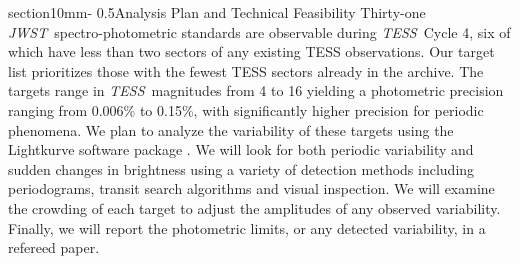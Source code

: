 \documentclass[letterpaper,12pt]{article}
\makeatletter
\renewcommand{\section}{\@startsection%
{section}{1}{0mm}{-\baselineskip}%
{0.5\baselineskip}{\normalfont\Large\bfseries}}%
\newcommand{\tess}{{\it TESS}}
\newcommand{\jwst}{{\it JWST}}
\makeatother
\begin{document}
\section{Analysis Plan and Technical Feasibility}
Thirty-one \jwst\ spectro-photometric standards are observable during \tess\ Cycle 4, six of which have less than two sectors of any existing TESS observations. Our target list prioritizes those with the fewest TESS sectors already in the archive. The targets range in \tess\ magnitudes from 4 to 16 yielding a photometric precision ranging from 0.006\% to 0.15\%, with significantly higher precision for periodic phenomena.  We plan to analyze the variability of these targets using the Lightkurve software package \citep{2018ascl.soft12013L}. We will look for both periodic variability and sudden changes in brightness using a variety of detection methods including periodograms, transit search algorithms and visual inspection. We will examine the crowding of each target to adjust the amplitudes of any observed variability. Finally, we will report the photometric limits, or any detected variability, in a refereed paper.


\clearpage

{}





\end{document}
